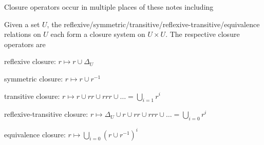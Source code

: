 Closure operators occur in multiple places of these notes including

\begin{example}
Given a set $U$, the reflexive/symmetric/transitive/reflexive-transitive/equivalence relations on $U$ each form a closure system on $U\times U$.
The respective closure operators are
\begin{compactitem}
 \item reflexive closure: $r\mapsto r\cup \Delta_U$
 \item symmetric closure: $r\mapsto r\cup r^{-1}$
 \item transitive closure: $r\mapsto r\cup rr \cup rrr\cup \ldots=\bigcup_{i=1}r^i$
 \item reflexive-transitive closure: $r\mapsto \Delta_U\cup r\cup rr \cup rrr\cup \ldots=\bigcup_{i=0}r^i$
 \item equivalence closure: $r\mapsto \bigcup_{i=0}(r\cup r^{-1})^i$
\end{compactitem}
\end{example}